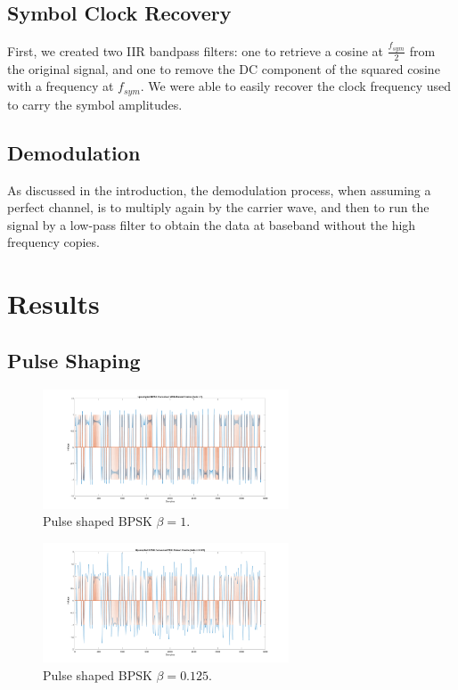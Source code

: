 \documentclass{article}
\begin{document}
\subsection{Symbol Clock Recovery}
First, we created two IIR bandpass filters: one to retrieve a cosine at $ \frac{f_{sym}}{2} $ from the original signal, and one to remove the DC component of the squared cosine with a frequency at $ f_{sym}. $ We were able to easily recover the clock frequency used to carry the symbol amplitudes.

\subsection{Demodulation}
As discussed in the introduction, the demodulation process, when assuming a perfect channel, is to multiply again by the carrier wave, and then to run the signal by a low-pass filter to obtain the data at baseband without the high frequency copies.


\section{Results}

\subsection{Pulse Shaping}

\begin{figure}[h]
  \begin{center}
    \includegraphics[width=0.65\textwidth]{img/upsampled_bpsk_raised_cosine_beta_1.png}
    \caption{Pulse shaped BPSK $\beta = 1$.}
  \end{center}
\end{figure}

\begin{figure}[h]
  \begin{center}
    \includegraphics[width=0.65\textwidth]{img/upsampled_bpsk_raised_cosine_beta_125.png}
    \caption{Pulse shaped BPSK $\beta = 0.125$.}
  \end{center}
\end{figure}
\end{document}
